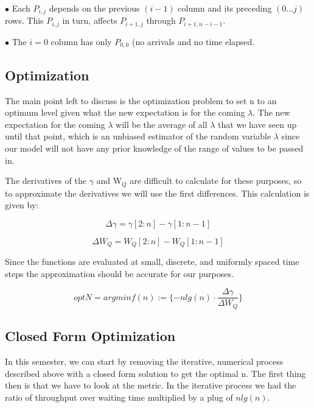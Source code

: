 \documentclass[conference]{IEEEtran}
\begin{document}
$\bullet$ Each $P_{i,j}$ depends on the previous $(i-1)$ column and its 
preceding $(0 ... j)$ rows. This $P_{i,j}$ in turn, affects $P_{i+1,j}$ through
$P_{i+1,n-i-1}$.

$\bullet$ The $i=0$ column has only $P_{0,0}$ (no arrivals and no time 
elapsed.

\subsection{Optimization}\label{optimization}

The main point left to discuss is the optimization problem to set n to an optimum level given what 
the new expectation is for the coming $\lambda$. The new expectation for the coming $\lambda$ will 
be the average of all $\lambda$ that we have seen up until that point, which is an unbiased estimator 
of the random variable $\lambda$ since our model will not have any prior knowledge of the range of 
values to be passed in. 
	
The derivatives of the $\gamma$ and W$_Q$ are difficult to calculate for these purposes, so to approximate 
the derivatives we will use the first differences. This calculation is given by:

\begin{equation}
\Delta \gamma = \gamma[2:n] - \gamma[1:n-1]\label{deltagamma_eq}
\end{equation}

\begin{equation}
\Delta W_Q  = W_Q [2:n] - W_Q [1:n-1]\label{deltawq_eq}
\end{equation}

Since the functions are evaluated at small, discrete, and uniformly spaced time steps the approximation 
should be accurate for our purposes. 

\begin{equation}
optN=argmin f(n):=\{ -nlg(n)\cdot\frac{\Delta \gamma}{\Delta W_Q}\}\label{optn_eq}
\end{equation}

\subsection{Closed Form Optimization}\label{closed_opt}

In this semester, we can start by removing the iterative, numerical process described above with 
a closed form solution to get the optimal n. The first thing then is that we have to look at the metric.
In the iterative process we had the ratio of throughput over waiting time multiplied by a plug of $n lg(n)$. 
\end{document}
